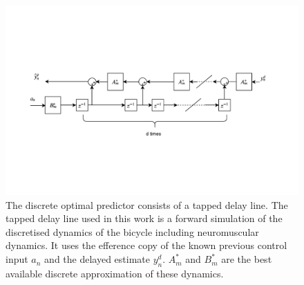 \begin{figure}[h!]
    \centering

    \includegraphics[width=\linewidth,trim={0 4.2cm 0 2cm},clip]{images/predictor_plots/tapped_delay.pdf}
    \caption{The discrete optimal predictor consists of a tapped delay line. The tapped delay line used in this work is a forward simulation of the discretised dynamics of the bicycle including neuromuscular dynamics. It uses the efference copy of the known previous control input \ensuremath{a_n}  and the delayed estimate \ensuremath{y^d_n}. \ensuremath{A^*_m} and \ensuremath{B^*_m} are the best available discrete approximation of these dynamics.}
    \label{fig:delay_line}
\end{figure}


